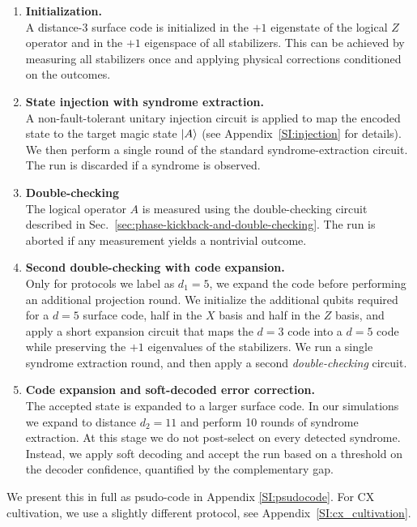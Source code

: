 \documentclass[twocolumn,notitlepage,nofootinbib,floatfix,superscriptaddress]{revtex4-1}
\begin{document}
\begin{enumerate}
    \item \textbf{Initialization.} \\
    A distance-$3$ surface code is initialized in the $+1$ eigenstate of the logical $Z$ operator and in the $+1$ eigenspace of all stabilizers. This can be achieved by measuring all stabilizers once and applying physical corrections conditioned on the outcomes.

    \item \textbf{State injection with syndrome extraction.} \\
    A non-fault-tolerant unitary injection circuit is applied to map the encoded state to the target magic state $\ket{A}$ (see Appendix~\ref{SI:injection} for details). We then perform a single round of the standard syndrome-extraction circuit. The run is discarded if a syndrome is observed.

\item \textbf{Double-checking} \\
The logical operator $A$ is measured using the double-checking circuit described in Sec.~\ref{sec:phase-kickback-and-double-checking}. The run is aborted if any measurement yields a nontrivial outcome.

\item \textbf{Second double-checking with code expansion.} \\
Only for protocols we label as $d_1=5$, we expand the code before performing an additional projection round. We initialize the additional qubits required for a $d=5$ surface code, half in the $X$ basis and half in the $Z$ basis, and apply a short expansion circuit that maps the $d=3$ code into a $d=5$ code while preserving the $+1$ eigenvalues of the stabilizers. We run a single syndrome extraction round, and then apply a second \textit{double-checking} circuit. 

    \item \textbf{Code expansion and soft-decoded error correction.} \\
    The accepted state is expanded to a larger surface code. In our simulations we expand to distance $d_2=11$ and perform 10 rounds of syndrome extraction. At this stage we do not post-select on every detected syndrome. Instead, we apply soft decoding and accept the run based on a threshold on the decoder confidence, quantified by the complementary gap. 
\end{enumerate}
We present this in full as psudo-code in Appendix \ref{SI:psudocode}. For CX cultivation, we use a slightly different protocol, see Appendix~\ref{SI:cx_cultivation}.
\end{document}
